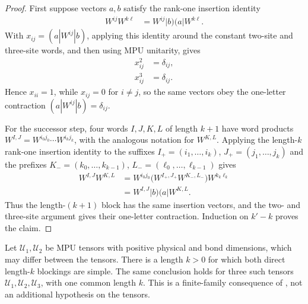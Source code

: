 \begin{proof}\leanok
    First suppose vectors $a,b$ satisfy the rank-one insertion identity
    \begin{align}
        W^{ij}W^{k\ell} & =W^{ij}|b)(a|W^{k\ell}.
    \end{align}
    With $x_{ij}=(a|W^{ij}|b)$, applying this identity around the constant
    two-site and three-site words, and then using MPU unitarity, gives
    \begin{align}
        x_{ij}^2 & =\delta_{ij}, \\
        x_{ij}^3 & =\delta_{ij}.
    \end{align}
    Hence $x_{ii}=1$, while $x_{ij}=0$ for $i\ne j$, so the same vectors obey
    the one-letter contraction $(a|W^{ij}|b)=\delta_{ij}$.

    For the successor step, four words $I,J,K,L$ of length $k+1$ have word products
    $W^{I,J}=W^{i_0j_0}\cdots W^{i_kj_k}$, with the analogous notation
    for $W^{K,L}$.  Applying the length-$k$ rank-one insertion identity to the suffixes
    $I_+=(i_1,\ldots,i_k)$, $J_+=(j_1,\ldots,j_k)$ and the prefixes
    $K_-=(k_0,\ldots,k_{k-1})$, $L_-=(\ell_0,\ldots,\ell_{k-1})$ gives
    \begin{align}
        W^{I,J}W^{K,L}
         & =W^{i_0j_0}\bigl(W^{I_+,J_+}W^{K_-,L_-}\bigr)W^{k_k\ell_k} \\
         & =W^{I,J}|b)(a|W^{K,L}.
    \end{align}
    Thus the length-$(k+1)$ block has the same insertion vectors, and the
    two- and three-site argument gives their one-letter contraction.  Induction
    on $k'-k$ proves the claim.
\end{proof}

\begin{lemma}
    \label{lem:mpu_common_simple_blocking_finite}
    \leanok
    Let $\mathcal U_1,\mathcal U_2$ be MPU tensors with positive physical and
    bond dimensions, which may differ between the tensors. There is a length
    $k>0$ for which both direct length-$k$ blockings are simple. The same
    conclusion holds for three such tensors $\mathcal U_1,\mathcal U_2,
        \mathcal U_3$, with one common length $k$.
    This is a finite-family consequence of
    \cite[Proposition~III.3]{Cirac2017MPU}, not an additional hypothesis on
    the tensors.
\end{lemma}

